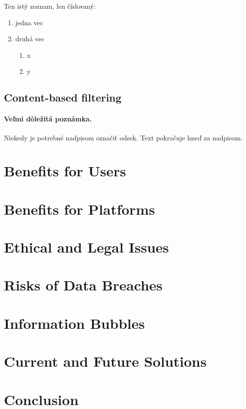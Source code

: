\documentclass[10pt,twoside,slovak,a4paper]{article}
\begin{document}
Ten istý zoznam, len číslovaný:

\begin{enumerate}
\item jedna vec
\item druhá vec
	\begin{enumerate}
	\item x
	\item y
	\end{enumerate}
\end{enumerate}


\subsection{Content-based filtering} \label{Types of recommendation systems:Content-based filtering}

\paragraph{Veľmi dôležitá poznámka.}
Niekedy je potrebné nadpisom označiť odsek. Text pokračuje hneď za nadpisom.


\section{Benefits for Users} \label{Benefits for Users}


\section{Benefits for Platforms} \label{Benefits for Platforms}

\section{Ethical and Legal Issues} \label{Ethical and Legal Issues}

\section{Risks of Data Breaches} \label{Risks of Data Breaches}

\section{Information Bubbles} \label{Information Bubbles}

\section{Current and Future Solutions} \label{Current and Future Solutions}

\section{Conclusion} \label{Conclusion}





\end{document}
